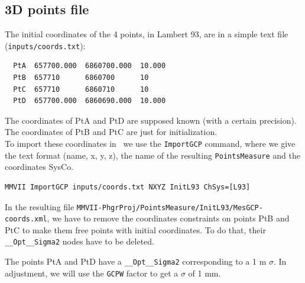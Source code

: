 
\subsection{3D points file}
The initial coordinates of the 4 points, in Lambert 93, are in a simple text file (\texttt{inputs/coords.txt}):

\begin{verbatim}
  PtA  657700.000  6860700.000  10.000
  PtB  657710      6860700      10
  PtC  657710      6860710      10
  PtD  657700.000  6860690.000  10.000
\end{verbatim}

The coordinates of PtA and PtD are supposed known (with a certain precision).
The coordinates of PtB and PtC are just for initialization.
\\

To import these coordinates in \CdPPP\ we use the \texttt{ImportGCP} command, where we give the text format
(name, x, y, z), the name of the resulting \texttt{PointsMeasure} and the coordinates SysCo.

\begin{lstlisting}
MMVII ImportGCP inputs/coords.txt NXYZ InitL93 ChSys=[L93]
\end{lstlisting}

In the resulting file \texttt{MMVII-PhgrProj/PointsMeasure/InitL93/MesGCP-coords.xml},
we have to remove the coordinates constraints on points PtB and PtC to make them free points
with initial coordinates. To do that, their \texttt{\_\_Opt\_\_Sigma2} nodes have to be deleted.

The points PtA and PtD have a \texttt{\_\_Opt\_\_Sigma2} corresponding to a 1 m $\sigma$. In adjustment,
we will use the \texttt{GCPW} factor to get a $\sigma$ of 1 mm.

